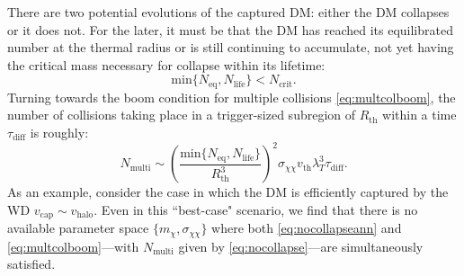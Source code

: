 \documentclass[preprintnumbers,amsmath,amssymb,prd,superscriptaddress]{revtex4}
\def\r{\right)}
\def\l{\left(}
\begin{document}
There are two potential evolutions of the captured DM: either the DM collapses or it does not. 
For the later, it must be that the DM has reached its equilibrated number at the thermal radius or is still continuing to accumulate, not yet having the critical mass necessary for collapse within its lifetime:
\begin{equation}
\label{eq:nocollapseann}
\text{min}\{N_\text{eq}, N_\text{life}\} < N_\text{crit}.
\end{equation}
Turning towards the boom condition for multiple collisions \eqref{eq:multcolboom}, the number of collisions taking place in a trigger-sized subregion of $R_\text{th}$ within a time $\tau_\text{diff}$ is roughly:
\begin{equation}
\label{eq:nocollapse}
N_\text{multi} \sim \l \frac{\text{min}\{N_\text{eq}, N_\text{life}\}}{R_\text{th}^3} \r^2 \sigma_{\chi \chi} v_\text{th} \lambda_T^3 \tau_\text{diff}. 
\end{equation}
As an example, consider the case in which the DM is efficiently captured by the WD $v_\text{cap} \sim v_\text{halo}$. 
Even in this ``best-case" scenario, we find that there is no available parameter space $\{m_\chi, \sigma_{\chi \chi}\}$ where both \eqref{eq:nocollapseann} and \eqref{eq:multcolboom}---with $N_\text{multi}$ given by \eqref{eq:nocollapse}---are simultaneously satisfied. 
\end{document}
